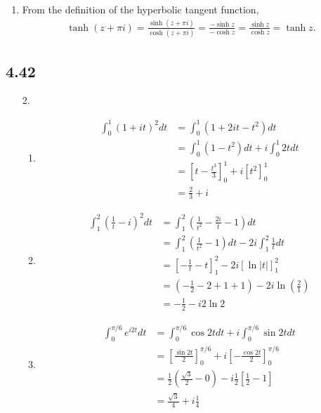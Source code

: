 \documentclass[a4paper,12pt]{article}
\begin{document}
\begin{enumerate}
\begin{enumerate}
            \item
                From the definition of the hyperbolic tangent function,
                \begin{align*}
                    \tanh(z + \pi i) = \frac{\sinh(z + \pi i)}{\cosh(z + \pi i)} = \frac{-\sinh z}{-\cosh z} = \frac{\sinh z}{\cosh z} = \tanh z.
                \end{align*}
        \end{enumerate}
\end{enumerate}

\subsection*{4.42}
\begin{enumerate}
    \item[2.]
        \begin{enumerate}
            \item
                \begin{align*}
                    \int_0^1 (1 + it)^2 dt &= \int_0^1 (1 + 2it - t^2) dt \\
                    &= \int_0^1 (1 - t^2) dt + i \int_0^1 2t dt \\
                    &= \left[ t - \frac{t^3}{3} \right]_0^1 + i \left[ t^2 \right]_0^1 \\
                    &= \frac{2}{3} + i
                \end{align*}

            \item
                \begin{align*}
                    \int_1^2 \left( \frac{1}{t} - i \right)^2 dt &= \int_1^2 \left( \frac{1}{t^2} - \frac{2i}{t} - 1 \right) dt \\
                    &= \int_1^2 \left( \frac{1}{t^2} - 1 \right) dt - 2i \int_1^2 \frac{1}{t} dt \\
                    &= \left[ -\frac{1}{t} - t \right]_1^2 - 2i [\ln|t|]_1^2 \\
                    &= \left( -\frac{1}{2} - 2 + 1 + 1 \right) - 2i \ln \left( \frac{2}{1} \right) \\
                    &= -\frac{1}{2} - i 2 \ln 2
                \end{align*}

            \item
                \begin{align*}
                    \int_0^{\pi/6} e^{i2t} dt &= \int_0^{\pi/6} \cos 2t dt + i \int_0^{\pi/6} \sin 2t dt \\
                    &= \left[ \frac{\sin 2t}{2} \right]_0^{\pi/6} + i \left[ -\frac{\cos 2t}{2} \right]_0^{\pi/6} \\
                    &= \frac{1}{2} \left( \frac{\sqrt{3}}{2} - 0 \right) - i \frac{1}{2} \left[ \frac{1}{2} - 1 \right] \\
                    &= \frac{\sqrt{3}}{4} + i \frac{1}{4}
                \end{align*}


\end{enumerate}
\end{enumerate}
\end{document}
